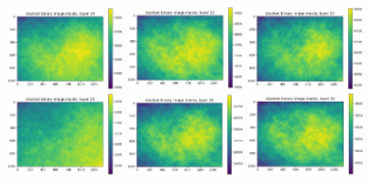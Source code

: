 \documentclass[letterpaper,11pt]{article}
\begin{document}
\begin{figure}[!ht]
\includegraphics[width=0.3\textwidth]{images/measuring_flatfield_corrections/mask_stack_layers_vectra/mask_stack_layer_19}
\includegraphics[width=0.3\textwidth]{images/measuring_flatfield_corrections/mask_stack_layers_vectra/mask_stack_layer_22}
\includegraphics[width=0.3\textwidth]{images/measuring_flatfield_corrections/mask_stack_layers_vectra/mask_stack_layer_25}
\includegraphics[width=0.3\textwidth]{images/measuring_flatfield_corrections/mask_stack_layers_vectra/mask_stack_layer_26}
\includegraphics[width=0.3\textwidth]{images/measuring_flatfield_corrections/mask_stack_layers_vectra/mask_stack_layer_29}
\includegraphics[width=0.3\textwidth]{images/measuring_flatfield_corrections/mask_stack_layers_vectra/mask_stack_layer_32}

\end{figure}
\end{document}
